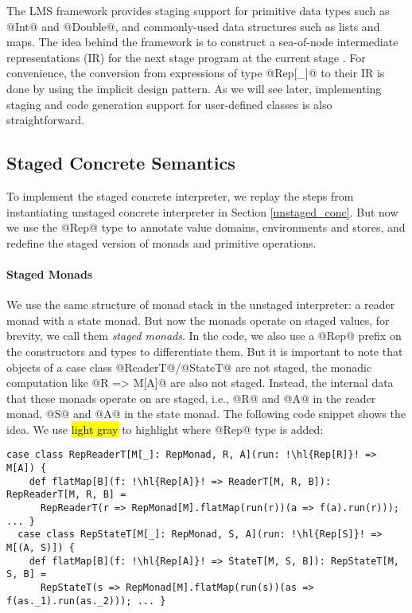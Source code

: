 The LMS framework provides staging support for primitive data types such as
@Int@ and @Double@, and commonly-used data structures such as lists and maps.
The idea behind the framework is to construct a sea-of-node intermediate
representations (IR) for the next stage program at the current stage
\cite{DBLP:conf/birthday/Rompf16}. For convenience, the conversion from
expressions of type @Rep[_]@ to their IR is done by using the implicit design
pattern. As we will see later, implementing staging and code generation
support for user-defined classes is also straightforward.

\subsection{Staged Concrete Semantics}

To implement the staged concrete interpreter, we replay the steps from
instantiating unstaged concrete interpreter in Section \ref{unstaged_conc}.
But now we use the @Rep@ type to annotate value domains, environments and
stores, and redefine the staged version of monads and primitive operations.

\paragraph{Staged Monads}
We use the same structure of monad stack in the unstaged interpreter: a reader
monad with a state monad. But now the monads operate on staged values, for
brevity, we call them \textit{staged monads}. In the code, we also use a @Rep@
prefix on the constructors and types to differentiate them. But it is important
to note that objects of a case class @ReaderT@/@StateT@ are not staged, the
monadic computation like @R => M[A]@ are also not staged. Instead, the internal
data that these monads operate on are staged, i.e., @R@ and @A@ in the
reader monad, @S@ and @A@ in the state monad. The following code
snippet shows the idea. We use \hl{light gray} to highlight where @Rep@ type is added:
\begin{lstlisting}[escapechar=!]
  case class RepReaderT[M[_]: RepMonad, R, A](run: !\hl{Rep[R]}! => M[A]) {
    def flatMap[B](f: !\hl{Rep[A]}! => ReaderT[M, R, B]): RepReaderT[M, R, B] =
      RepReaderT(r => RepMonad[M].flatMap(run(r))(a => f(a).run(r))); ... }
  case class RepStateT[M[_]: RepMonad, S, A](run: !\hl{Rep[S]}! => M[(A, S)]) {
    def flatMap[B](f: !\hl{Rep[A]}! => StateT[M, S, B]): RepStateT[M, S, B] =
      RepStateT(s => RepMonad[M].flatMap(run(s))(as => f(as._1).run(as._2))); ... }
\end{lstlisting}

